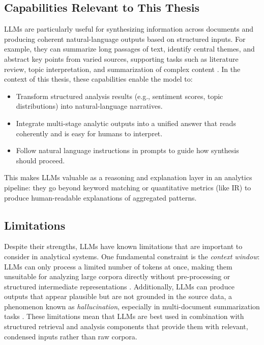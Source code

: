 \subsection{Capabilities Relevant to This Thesis}

LLMs are particularly useful for synthesizing information across documents and producing coherent natural-language outputs based on structured inputs. For example, they can summarize long passages of text, identify central themes, and abstract key points from varied sources, supporting tasks such as literature review, topic interpretation, and summarization of complex content \cite{bigoulaeva2025inherent}\cite{what_are_llms_ibm}. In the context of this thesis, these capabilities enable the model to:
\begin{itemize}
    \item Transform structured analysis results (e.g., sentiment scores, topic distributions) into natural-language narratives.
    \item Integrate multi-stage analytic outputs into a unified answer that reads coherently and is easy for humans to interpret.
    \item Follow natural language instructions in prompts to guide how synthesis should proceed.
\end{itemize}

This makes LLMs valuable as a reasoning and explanation layer in an analytics pipeline: they go beyond keyword matching or quantitative metrics (like IR) to produce human-readable explanations of aggregated patterns.

\subsection{Limitations}

Despite their strengths, LLMs have known limitations that are important to consider in analytical systems. One fundamental constraint is the \textit{context window}: \\
LLMs can only process a limited number of tokens at once, making them unsuitable for analyzing large corpora directly without pre-processing or structured intermediate representations \cite{large_language_model_wikipedia}. Additionally, LLMs can produce outputs that appear plausible but are not grounded in the source data, a phenomenon known as \textit{hallucination}, especially in multi-document summarization tasks \cite{belem2025singlemultillmshallucinate}. These limitations mean that LLMs are best used in combination with structured retrieval and analysis components that provide them with relevant, condensed inputs rather than raw corpora.

